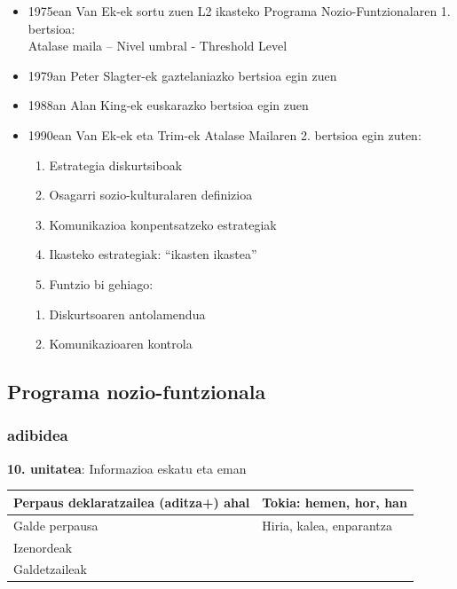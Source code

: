 \documentclass[
]{book}
\providecommand{\tightlist}{%
  \setlength{\itemsep}{0pt}\setlength{\parskip}{0pt}}
\begin{document}
\begin{itemize}
\tightlist
\item
  1975ean Van Ek-ek sortu zuen L2 ikasteko Programa Nozio-Funtzionalaren 1. bertsioa:\\
  Atalase maila -- Nivel umbral - Threshold Level
\item
  1979an Peter Slagter-ek gaztelaniazko bertsioa egin zuen
\item
  1988an Alan King-ek euskarazko bertsioa egin zuen
\item
  1990ean Van Ek-ek eta Trim-ek Atalase Mailaren 2. bertsioa egin zuten:

  \begin{enumerate}
  \def\labelenumi{\arabic{enumi}.}
  \tightlist
  \item
    Estrategia diskurtsiboak
  \item
    Osagarri sozio-kulturalaren definizioa
  \item
    Komunikazioa konpentsatzeko estrategiak
  \item
    Ikasteko estrategiak: ``ikasten ikastea''
  \item
    Funtzio bi gehiago:
  \end{enumerate}

  \begin{enumerate}
  \def\labelenumi{\alph{enumi}.}
  \tightlist
  \item
    Diskurtsoaren antolamendua
  \item
    Komunikazioaren kontrola
  \end{enumerate}
\end{itemize}

\hypertarget{programa-nozio-funtzionala}{%
\subsection{Programa nozio-funtzionala}\label{programa-nozio-funtzionala}}

\hypertarget{adibidea}{%
\subsubsection{adibidea}\label{adibidea}}

\textbf{10. unitatea}: Informazioa eskatu eta eman

\begin{longtable}[]{@{}ll@{}}
\toprule
Perpaus deklaratzailea (aditza+) ahal & Tokia: hemen, hor, han \\
\midrule
\endhead
Galde perpausa & Hiria, kalea, enparantza \\
Izenordeak & \\
Galdetzaileak & \\
\bottomrule
\end{longtable}
\end{document}
